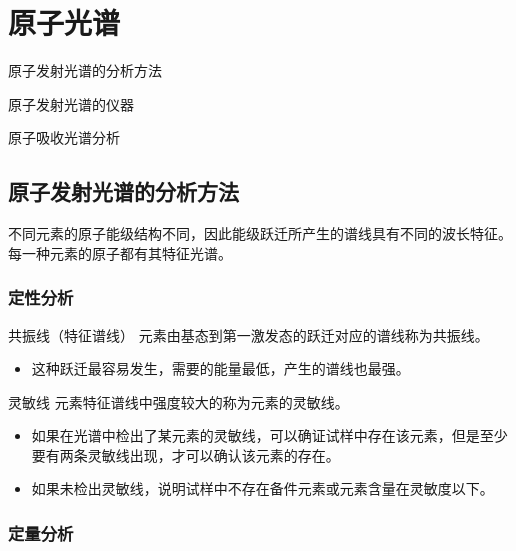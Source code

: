 \chapter{原子光谱}

\begin{introduction}
	\item 原子发射光谱的分析方法
	\item 原子发射光谱的仪器
	\item 原子吸收光谱分析
\end{introduction}



\section{原子发射光谱的分析方法}

不同元素的原子能级结构不同，因此能级跃迁所产生的谱线具有不同的波长特征。每一种元素的原子都有其特征光谱。
\subsection{定性分析}

\begin{definition*}{共振线（特征谱线）}{}
	元素由基态到第一激发态的跃迁对应的谱线称为共振线。
	\begin{itemize}
		\item 这种跃迁最容易发生，需要的能量最低，产生的谱线也最强。
	\end{itemize}
\end{definition*}

\begin{definition*}{灵敏线}{}
	元素特征谱线中强度较大的称为元素的灵敏线。

\begin{itemize}
	\item 如果在光谱中检出了某元素的灵敏线，可以确证试样中存在该元素，但是至少要有两条灵敏线出现，才可以确认该元素的存在。
	\item 如果未检出灵敏线，说明试样中不存在备件元素或元素含量在灵敏度以下。
\end{itemize}
\end{definition*}

\subsection{定量分析}

